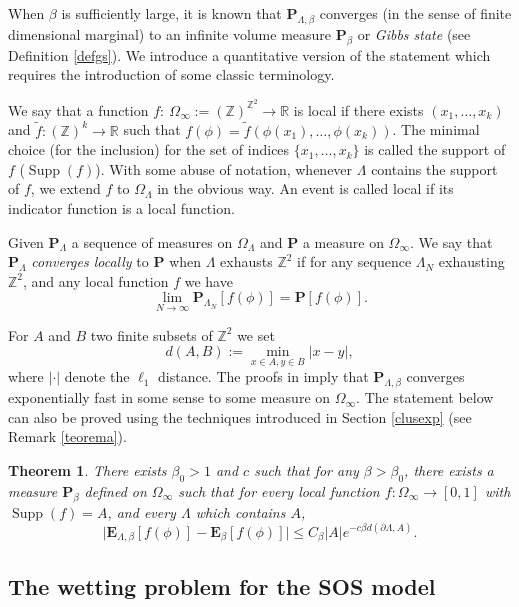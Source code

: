 \documentclass[10pt]{amsart}
\numberwithin{equation}{section}
\theoremstyle{plain}
\newtheorem{theorema}{Theorem}
\theoremstyle{definition}
\DeclareMathOperator{\Supp}{Supp}
\newcommand{\bP}{{\ensuremath{\mathbf P}} }
\newcommand{\bE}{{\ensuremath{\mathbf E}} }
\newcommand{\bbR}{{\ensuremath{\mathbb R}} }
\newcommand{\bbZ}{{\ensuremath{\mathbb Z}} }
\newcommand{\gb}{\beta}
\newcommand{\gO}{\Omega}
\newcommand{\gL}{\Lambda}
\begin{document}
When $\gb$ is sufficiently large, it is known \cite[Th.\,2]{cf:BM} that $\bP_{\gL,\gb}$ converges (in the sense of finite dimensional marginal)
to an infinite volume measure $\bP_{\gb}$ or \textit{Gibbs state} (see Definition \ref{defgs}). We introduce a quantitative version of the statement which requires
the introduction of some classic terminology.

We say that a function $f: \ \gO_{\infty}:=(\bbZ)^{\bbZ^2}\to \bbR$ is local if there exists $(x_1,\dots,x_k)$ and $\tilde f: (\bbZ)^{k}\to \bbR$
such that $f(\phi)=\tilde f(\phi(x_1),\dots,\phi(x_k))$. The minimal choice (for the inclusion)
for the set of indices $\{x_1,\dots, x_k\}$ is called the support of $f$ ($\Supp(f)$).
With some abuse of notation, whenever $\gL$ contains the support of $f$, we extend $f$ to $\gO_{\gL}$ in the obvious way.
An event is called local if its indicator function is a local function.

Given $\bP_{\gL}$ a sequence of measures on $\gO_{\gL}$ and $\bP$ a measure on $\gO_{\infty}$.
We say that~$\bP_{\gL}$ \textit{converges locally} to $\bP$ when $\gL$ exhausts $\bbZ^2$ if for any sequence $\gL_N$ exhausting $\bbZ^2$,
and any local function $f$ we have
\[
\lim_{N\to \infty} \bP_{\gL_N}[f(\phi)]=\bP[f(\phi)].
\]

For $A$ and $B$ two finite subsets of $\bbZ^2$ we set
\begin{equation*}%
d(A,B):=\min_{x\in A, y\in B} |x-y|,
\end{equation*}
where $|\cdot|$ denote the $\ell_1$ distance. The proofs in \cite{cf:BM} imply that $\bP_{\gL,\gb}$
converges exponentially fast in some sense to some measure on $\gO_{\infty}$. The statement below can also be proved using the
techniques introduced in Section \ref{clusexp} (see Remark \ref{teorema}).

\begin{theorema}\label{infinitevol}
There exists $\gb_0>1$ and $c$ such that
for any $\gb>\gb_0$,
there exists a measure $\bP_{\gb}$ defined on $\gO_{\infty}$ such that for every local function
$f: \gO_{\infty}\to [0,1]$ with $\Supp(f)=A$, and every $\gL$ which contains $A$,
\begin{equation*}%
\bigl| \bE_{\gL,\gb}[f(\phi)]-\bE_{\gb}[f(\phi)] \bigr|\le C_{\gb} |A| e^{-c \gb d(\partial \gL, A)}.
\end{equation*}
\end{theorema}

\subsection{The wetting problem for the SOS model}
\end{document}
